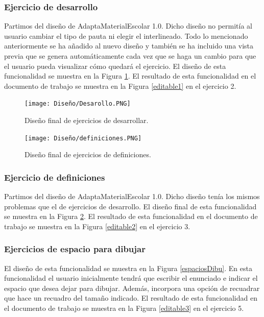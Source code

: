 \subsubsection{Ejercicio de desarrollo}
Partimos del diseño de AdaptaMaterialEscolar 1.0. Dicho diseño no permitía al usuario cambiar el tipo de pauta ni elegir el interlineado. Todo lo mencionado anteriormente se ha añadido al nuevo diseño y también se ha incluido una vista previa que se genera automáticamente cada vez que se haga un cambio para que el usuario pueda visualizar cómo quedará el ejercicio. El diseño de esta funcionalidad se muestra en la Figura \ref{DesarrolloFinal}. El resultado de esta funcionalidad en el documento de trabajo se muestra en la Figura \ref{editable1} en el ejercicio 2.

\begin{figure}[ht!]
  \centering
  \texttt{[image: Diseño/Desarollo.PNG]}
  \caption{Diseño final de ejercicios de desarrollar.}
  \label{DesarrolloFinal}
\end{figure}

\begin{figure}[ht!]
  \centering
  \texttt{[image: Diseño/definiciones.PNG]}
  \caption{Diseño final de ejercicios de definiciones.}
  \label{defi}
\end{figure}

\subsubsection{Ejercicio de definiciones}
Partimos del diseño de AdaptaMaterialEscolar 1.0. Dicho diseño tenía los mismos problemas que el de ejercicios de desarrollo. El diseño final de esta funcionalidad se muestra en la Figura \ref{defi}. El resultado de esta funcionalidad en el documento de trabajo se muestra en la Figura \ref{editable2} en el ejercicio 3.


\subsubsection{Ejercicios de espacio para dibujar}
El diseño de esta funcionalidad se muestra en la Figura \ref{espaciosDibu}. En esta funcionalidad el usuario inicialmente tendrá que escribir el enunciado e indicar el espacio que desea dejar para dibujar. Además, incorpora una opción de recuadrar que hace un recuadro del tamaño indicado. El resultado de esta funcionalidad en el documento de trabajo se muestra en la Figura \ref{editable3} en el ejercicio 5.


